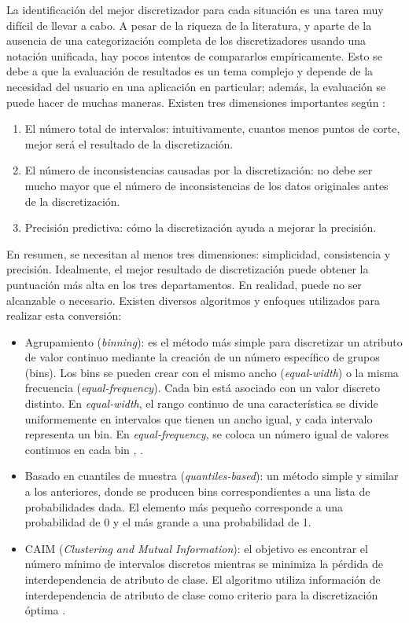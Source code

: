 La identificación del mejor discretizador para cada situación es una tarea muy difícil de llevar a cabo. A pesar de la riqueza de la literatura, y aparte de la ausencia de una categorización completa de los discretizadores usando una notación unificada, hay pocos intentos de compararlos empíricamente. Esto se debe a que la evaluación de resultados es un tema complejo y depende de la necesidad del usuario en una aplicación en particular; además, la evaluación se puede hacer de muchas maneras. Existen tres dimensiones importantes según \citep{liu2002discretization}: 
\begin{enumerate}
	\item El número total de intervalos: intuitivamente, cuantos menos puntos de corte, mejor será el resultado de la discretización.
	\item El número de inconsistencias causadas por la discretización: no debe ser mucho mayor que el número de inconsistencias de los datos originales antes de la discretización.
	\item Precisión predictiva: cómo la discretización ayuda a mejorar la precisión.
\end{enumerate}
En resumen, se necesitan al menos tres dimensiones: simplicidad, consistencia y precisión. Idealmente, el mejor resultado de discretización puede obtener la puntuación más alta en los tres departamentos. En realidad, puede no ser alcanzable o necesario. Existen diversos algoritmos y enfoques utilizados para realizar esta conversión:

\begin{itemize}
	
	\item Agrupamiento (\textit{binning}): es el método más simple para discretizar un atributo de valor continuo mediante la creación de un número específico de grupos (bins). Los bins se pueden crear con el mismo ancho (\textit{equal-width}) o la misma frecuencia (\textit{equal-frequency}). Cada bin está asociado con un valor discreto distinto. En \textit{equal-width}, el rango continuo de una característica se divide uniformemente en intervalos que tienen un ancho igual, y cada intervalo representa un bin. En \textit{equal-frequency}, se coloca un número igual de valores continuos en cada bin \citep{liu2002discretization}, \citep{yang2009discretization}. 
	
	\item Basado en cuantiles de muestra (\textit{quantiles-based}): un método simple y similar a los anteriores, donde se producen bins correspondientes a una lista de probabilidades dada. El elemento más pequeño corresponde a una probabilidad de 0 y el más grande a una probabilidad de 1. 
	
	\item CAIM (\textit{Clustering and Mutual Information}): el objetivo es encontrar el número mínimo de intervalos discretos mientras se minimiza la pérdida de interdependencia de atributo de clase. El algoritmo utiliza información de interdependencia de atributo de clase como criterio para la discretización óptima \citep{kurgan2004caim}. 
	
\end{itemize}

